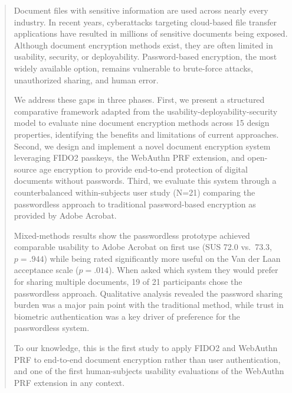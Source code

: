 \begin{abstract}
\hspace*{\parindent}Document files with sensitive information are used across nearly every industry. In recent years, cyberattacks targeting cloud-based file transfer applications have resulted in millions of sensitive documents being exposed. Although document encryption methods exist, they are often limited in usability, security, or deployability. Password-based encryption, the most widely available option, remains vulnerable to brute-force attacks, unauthorized sharing, and human error.

We address these gaps in three phases. First, we present a structured comparative framework adapted from the usability-deployability-security model to evaluate nine document encryption methods across 15 design properties, identifying the benefits and limitations of current approaches. Second, we design and implement a novel document encryption system leveraging FIDO2 passkeys, the WebAuthn PRF extension, and open-source age encryption to provide end-to-end protection of digital documents without passwords. Third, we evaluate this system through a counterbalanced within-subjects user study (N=21) comparing the passwordless approach to traditional password-based encryption as provided by Adobe Acrobat\textregistered{}.

Mixed-methods results show the passwordless prototype achieved comparable usability to Adobe Acrobat on first use (SUS 72.0 vs.\ 73.3, $p=.944$) while being rated significantly more useful on the Van der Laan acceptance scale ($p=.014$). When asked which system they would prefer for sharing multiple documents, 19 of 21 participants chose the passwordless approach. Qualitative analysis revealed the password sharing burden was a major pain point with the traditional method, while trust in biometric authentication was a key driver of preference for the passwordless system.

To our knowledge, this is the first study to apply FIDO2 and WebAuthn PRF to end-to-end document encryption rather than user authentication, and one of the first human-subjects usability evaluations of the WebAuthn PRF extension in any context.
\end{abstract}
